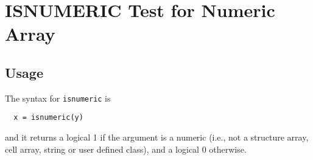 \section{ISNUMERIC Test for Numeric Array}

\subsection{Usage}

The syntax for \verb|isnumeric| is
\begin{verbatim}
  x = isnumeric(y)
\end{verbatim}
and it returns a logical 1 if the argument is a numeric
(i.e., not a structure array, cell array, string or user
defined class), and a logical 0 otherwise.

